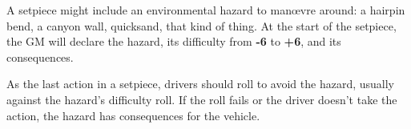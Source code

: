 
A setpiece might include an environmental hazard to man\oe{}vre around: a hairpin bend, a canyon wall, quicksand, that kind of thing. At the start of the setpiece, the GM will declare the hazard, its difficulty from \textbf{-6} to \textbf{+6}, and its consequences.

As the last action in a setpiece, drivers should roll to avoid the hazard, usually  against the hazard's difficulty roll. If the roll fails or the driver doesn't take the action, the hazard has consequences for the vehicle.
